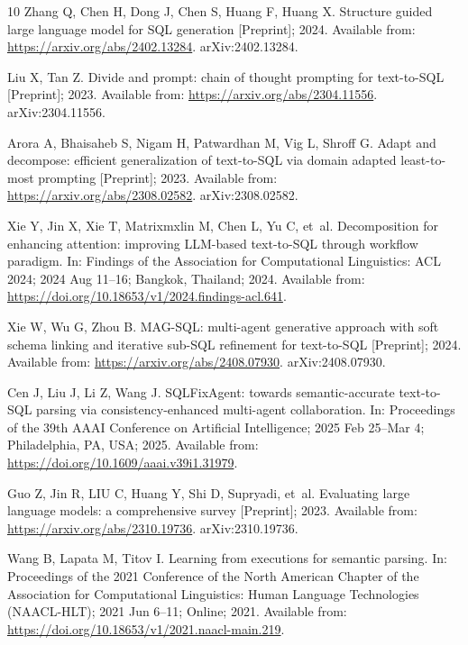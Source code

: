 \begin{thebibliography}{10}
Zhang Q, Chen H, Dong J, Chen S, Huang F, Huang X.
\newblock Structure guided large language model for SQL generation [Preprint];
  2024.
\newblock Available from: \url{https://arxiv.org/abs/2402.13284}.
\newblock arXiv:2402.13284.

Liu X, Tan Z.
\newblock Divide and prompt: chain of thought prompting for text-to-SQL
  [Preprint]; 2023.
\newblock Available from: \url{https://arxiv.org/abs/2304.11556}.
\newblock arXiv:2304.11556.

Arora A, Bhaisaheb S, Nigam H, Patwardhan M, Vig L, Shroff G.
\newblock Adapt and decompose: efficient generalization of text-to-SQL via
  domain adapted least-to-most prompting [Preprint]; 2023.
\newblock Available from: \url{https://arxiv.org/abs/2308.02582}.
\newblock arXiv:2308.02582.

Xie Y, Jin X, Xie T, Matrixmxlin M, Chen L, Yu C, et~al.
\newblock Decomposition for enhancing attention: improving LLM-based
  text-to-SQL through workflow paradigm.
\newblock In: Findings of the Association for Computational Linguistics: ACL
  2024; 2024 Aug 11--16; Bangkok, Thailand; 2024. Available from:
  \url{https://doi.org/10.18653/v1/2024.findings-acl.641}.

Xie W, Wu G, Zhou B.
\newblock MAG-SQL: multi-agent generative approach with soft schema linking and
  iterative sub-SQL refinement for text-to-SQL [Preprint]; 2024.
\newblock Available from: \url{https://arxiv.org/abs/2408.07930}.
\newblock arXiv:2408.07930.

Cen J, Liu J, Li Z, Wang J.
\newblock SQLFixAgent: towards semantic-accurate text-to-SQL parsing via
  consistency-enhanced multi-agent collaboration.
\newblock In: Proceedings of the 39th AAAI Conference on Artificial
  Intelligence; 2025 Feb 25--Mar 4; Philadelphia, PA, USA; 2025. Available
  from: \url{https://doi.org/10.1609/aaai.v39i1.31979}.

Guo Z, Jin R, LIU C, Huang Y, Shi D, Supryadi, et~al.
\newblock Evaluating large language models: a comprehensive survey [Preprint];
  2023.
\newblock Available from: \url{https://arxiv.org/abs/2310.19736}.
\newblock arXiv:2310.19736.

Wang B, Lapata M, Titov I.
\newblock Learning from executions for semantic parsing.
\newblock In: Proceedings of the 2021 Conference of the North American Chapter
  of the Association for Computational Linguistics: Human Language Technologies
  (NAACL-HLT); 2021 Jun 6--11; Online; 2021. Available from:
  \url{https://doi.org/10.18653/v1/2021.naacl-main.219}.


\end{thebibliography}
